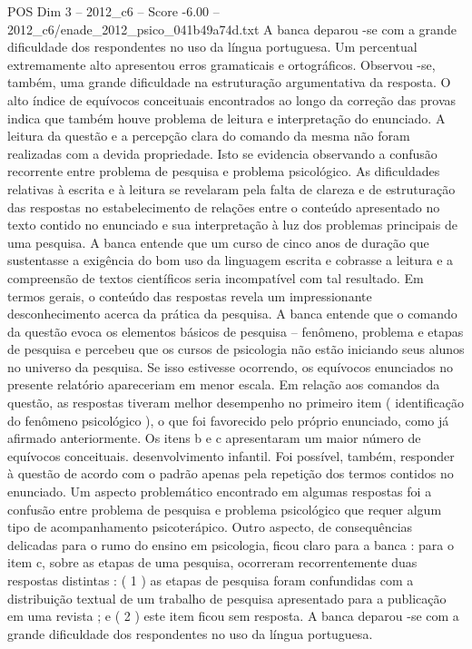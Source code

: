 \begin{textsample}{POS Dim 3 – 2012\_c6 – Score -6.00 – 2012\_c6/enade\_2012\_psico\_041b49a74d.txt}
A banca deparou -se com a grande dificuldade dos respondentes no uso da língua portuguesa.
Um percentual extremamente alto apresentou erros gramaticais e ortográficos.
Observou -se, também, uma grande dificuldade na estruturação argumentativa da resposta.
O alto índice de equívocos conceituais encontrados ao longo da correção das provas indica que também houve problema de leitura e interpretação do enunciado.
A leitura da questão e a percepção clara do comando da mesma não foram realizadas com a devida propriedade.
Isto se evidencia observando a confusão recorrente entre problema de pesquisa e problema psicológico.
As dificuldades relativas à escrita e à leitura se revelaram pela falta de clareza e de estruturação das respostas no estabelecimento de relações entre o conteúdo apresentado no texto contido no enunciado e sua interpretação à luz dos problemas principais de uma pesquisa.
A banca entende que um curso de cinco anos de duração que sustentasse a exigência do bom uso da linguagem escrita e cobrasse a leitura e a compreensão de textos científicos seria incompatível com tal resultado.
Em termos gerais, o conteúdo das respostas revela um impressionante desconhecimento acerca da prática da pesquisa.
A banca entende que o comando da questão evoca os elementos básicos de pesquisa – fenômeno, problema e etapas de pesquisa e percebeu que os cursos de psicologia não estão iniciando seus alunos no universo da pesquisa.
Se isso estivesse ocorrendo, os equívocos enunciados no presente relatório apareceriam em menor escala.
Em relação aos comandos da questão, as respostas tiveram melhor desempenho no primeiro item ( identificação do fenômeno psicológico ), o que foi favorecido pelo próprio enunciado, como já afirmado anteriormente.
Os itens b e c apresentaram um maior número de equívocos conceituais. desenvolvimento infantil.
Foi possível, também, responder à questão de acordo com o padrão apenas pela repetição dos termos contidos no enunciado.
Um aspecto problemático encontrado em algumas respostas foi a confusão entre problema de pesquisa e problema psicológico que requer algum tipo de acompanhamento psicoterápico.
Outro aspecto, de consequências delicadas para o rumo do ensino em psicologia, ficou claro para a banca : para o item c, sobre as etapas de uma pesquisa, ocorreram recorrentemente duas respostas distintas : ( 1 ) as etapas de pesquisa foram confundidas com a distribuição textual de um trabalho de pesquisa apresentado para a publicação em uma revista ; e ( 2 ) este item ficou sem resposta.
A banca deparou -se com a grande dificuldade dos respondentes no uso da língua portuguesa.

\end{textsample}

